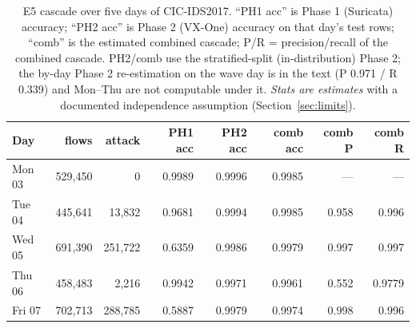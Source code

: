 \documentclass[sigconf,anonymous=false]{acmart}
\begin{document}
\begin{table}[t]
\caption{E5 cascade over five days of CIC-IDS2017. ``PH1 acc'' is Phase 1 (Suricata) accuracy; ``PH2 acc'' is Phase 2 (VX-One) accuracy on that day's test rows; ``comb'' is the estimated combined cascade; P/R = precision/recall of the combined cascade. PH2/comb use the stratified-split (in-distribution) Phase 2; the by-day Phase 2 re-estimation on the wave day is in the text (P 0.971 / R 0.339) and Mon--Thu are not computable under it. \emph{Stats are estimates} with a documented independence assumption (Section~\ref{sec:limits}).}
\label{tab:e5}
\small
\setlength{\tabcolsep}{3.5pt}
\begin{tabular}{lrrrrrrr}
\toprule
Day & flows & attack & PH1 acc & PH2 acc & comb acc & comb P & comb R \\
\midrule
Mon 03 & 529{,}450 & 0        & 0.9989 & 0.9996 & 0.9985 & ---    & ---    \\
Tue 04 & 445{,}641 & 13{,}832 & 0.9681 & 0.9994 & 0.9985 & 0.958 & 0.996 \\
Wed 05 & 691{,}390 & 251{,}722 & 0.6359 & 0.9986 & 0.9979 & 0.997 & 0.997 \\
Thu 06 & 458{,}483 & 2{,}216  & 0.9942 & 0.9971 & 0.9961 & 0.552 & 0.9779 \\
Fri 07 & 702{,}713 & 288{,}785 & 0.5887 & 0.9979 & 0.9974 & 0.998 & 0.996 \\
\bottomrule
\end{tabular}
\end{table}
\end{document}
